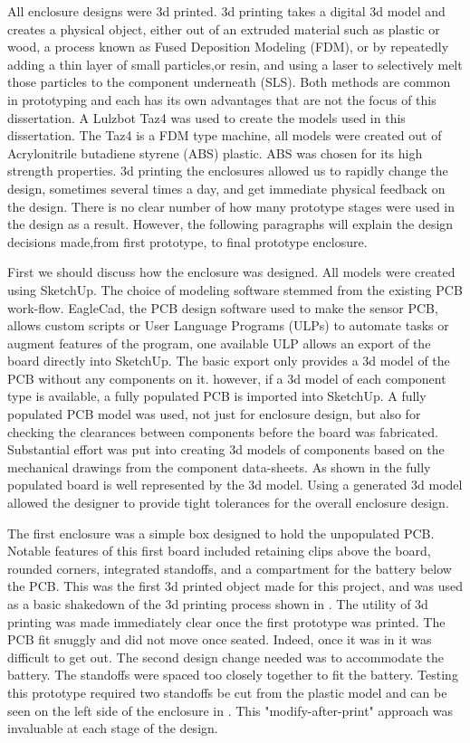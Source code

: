 All enclosure designs were 3d printed. 3d printing takes a digital 3d model and creates a physical object, either out of an extruded material such as plastic or wood, a process known as Fused Deposition Modeling (FDM), or by repeatedly adding a thin layer of small particles,or resin, and using a laser to selectively melt those particles to the component underneath (SLS). Both methods are common in prototyping and each has its own advantages that are not the focus of this dissertation. A Lulzbot Taz4 \cite{LULZBOT} was used to create the models used in this dissertation. The Taz4 is a FDM type machine, all models were created out of Acrylonitrile butadiene styrene (ABS) plastic. ABS was chosen for its high strength properties. 3d printing the enclosures allowed us to rapidly change the design, sometimes several times a day, and get immediate physical feedback on the design. There is no clear number of how many prototype stages were used in the design as a result. However, the following paragraphs will explain the design decisions made,from first prototype, to final prototype enclosure.


First we should discuss how the enclosure was designed. All models were created using SketchUp\cite{Sketchup}. The choice of modeling software stemmed from the existing PCB work-flow. EagleCad, the PCB design software used to make the sensor PCB, allows custom scripts or User Language Programs (ULPs) to automate tasks or augment features of the program, one available ULP allows an export of the board directly into SketchUp. The basic export only provides a 3d model of the PCB without any components on it. however, if a 3d model of each component type is available, a fully populated PCB is imported into SketchUp. A fully populated PCB model was used, not just for enclosure design, but also for checking the clearances between components before the board was fabricated. Substantial effort was put into creating 3d models of components based on the mechanical drawings from the component data-sheets. As shown in  the fully populated board is well represented by the 3d model. Using a generated 3d model allowed the designer to provide tight tolerances for the overall enclosure design. 

The first enclosure was a simple box designed to hold the unpopulated PCB. Notable features of this first board included retaining clips above the board, rounded corners, integrated standoffs, and a compartment for the battery below the PCB. This was the first 3d printed object made for this project, and was used as a basic shakedown of the 3d printing process shown in . The utility of 3d printing was made immediately clear once the first prototype was printed. The PCB fit snuggly and did not move once seated. Indeed, once it was in it was difficult to get out. The second design change needed was to accommodate the battery. The standoffs were spaced too closely together to fit the battery. Testing this prototype required two standoffs be cut from the plastic model and can be seen on the left side of the enclosure in  . This "modify-after-print" approach was invaluable at each stage of the design.

